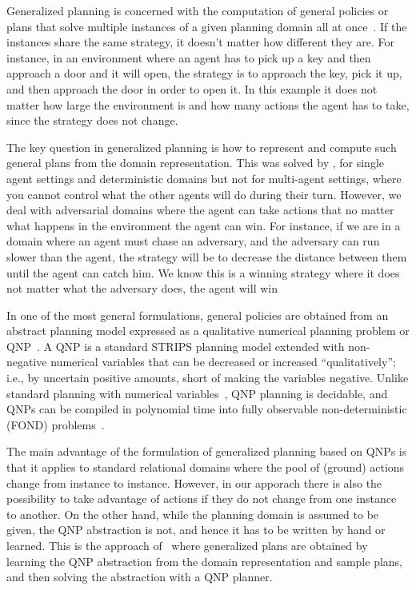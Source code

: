 \documentclass[a4paper]{article}
\begin{document}
Generalized planning is concerned with the computation of general policies or plans that solve multiple instances of a given planning domain all at once~\cite{srivastava2008network, ramirez2009plan, belle2016foundations, aguas2016generalized}. If the instances share the same strategy, it doesn't matter how different they are. For instance, in an environment where an agent has to pick up a key and then approach a door and it will open, the strategy is to approach the key, pick it up, and then approach the door in order to open it. In this example it does not matter how large the environment is and how many actions the agent has to take, since the strategy does not change.

The key question in generalized planning is how to represent and compute such general plans from the domain representation. This was solved by \cite{frances2021learning}, for single agent settings and deterministic domains but not for multi-agent settings, where you cannot control what the other agents will do during their turn. However, we deal with adversarial domains where the agent can take actions that no matter what happens in the environment the agent can win. For instance, if we are in a domain where an agent must chase an adversary, and the adversary can run slower than the agent, the strategy will be to decrease the distance between them until the agent can catch him. We know this is a winning strategy where it does not matter what the adversary does, the agent will win

In one of the most general formulations, general policies are obtained from an abstract planning model expressed as a qualitative numerical planning problem or QNP~\cite{srivastava2008network}. A QNP is a standard STRIPS planning model extended with non-negative numerical variables that can be decreased or increased “qualitatively”; i.e., by uncertain positive amounts, short of making the variables negative. Unlike standard planning with numerical variables~\cite{helmert2002decidability}, QNP planning is decidable, and QNPs can be compiled in polynomial time into fully observable non-deterministic (FOND) problems~\cite{bonet2020high}.

The main advantage of the formulation of generalized planning based on QNPs is that it applies to standard relational domains where the pool of (ground) actions change from instance to instance. However, in our apporach there is also the possibility to take advantage of actions if they do not change from one instance to another. On the other hand, while the planning domain is assumed to be given, the QNP abstraction is not, and hence it has to be written by hand or learned. This is the approach of~\cite{DBLP:conf/aaai/BonetFG19} where generalized plans are obtained by learning the QNP abstraction from the domain representation and sample plans, and then solving the abstraction with a QNP planner.
\end{document}
